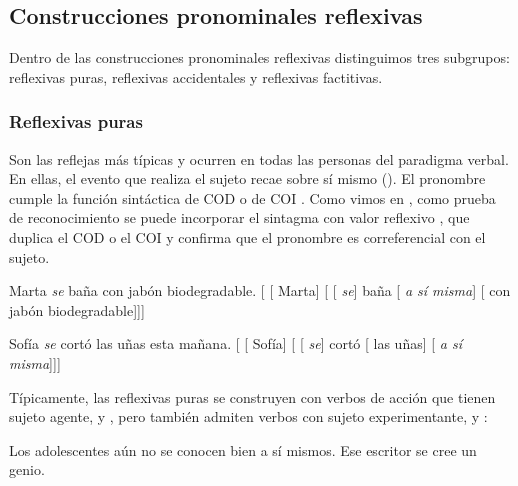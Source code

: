 \subsection{Construcciones pronominales reflexivas}\label{sec:10-reflexivas}

Dentro de las construcciones pronominales reflexivas distinguimos tres
subgrupos: reflexivas puras, reflexivas accidentales y reflexivas factitivas.

\subsubsection{Reflexivas puras}\label{sec:10-puras}

Son las reflejas más típicas y ocurren en todas las personas del paradigma
verbal. En ellas, el evento que realiza el sujeto recae sobre sí mismo
(). El pronombre cumple la función
sintáctica de COD  o de COI . Como vimos en
, como prueba de reconocimiento se puede incorporar el
sintagma con valor reflexivo , que duplica el COD o el COI y
confirma que el pronombre es correferencial con el sujeto.

\begin{exe}
  \ex\label{ex:10-marta}
    \begin{xlist}
      \ex Marta \textit{se} baña con jabón biodegradable.
      \ex {}[ [ Marta] [ [
          \textit{se}] baña [ \textit{a sí misma}]
          [ con jabón biodegradable]]]
    \end{xlist}
  \ex\label{ex:10-sofia}
    \begin{xlist}
      \ex Sofía \textit{se} cortó las uñas esta mañana.
      \ex {}[ [ Sofía] [ [
          \textit{se}] cortó [ las uñas] [
          \textit{a sí misma}]]]
    \end{xlist}
\end{exe}

Típicamente, las reflexivas puras se construyen con verbos de acción que tienen
sujeto agente,  y , pero también admiten
verbos con sujeto experimentante,  y
:

\begin{exe}
  \ex\label{ex:10-adolescentes} Los adolescentes aún no se conocen bien a sí
      mismos.
  \ex\label{ex:10-genio} Ese escritor se cree un genio.
\end{exe}

